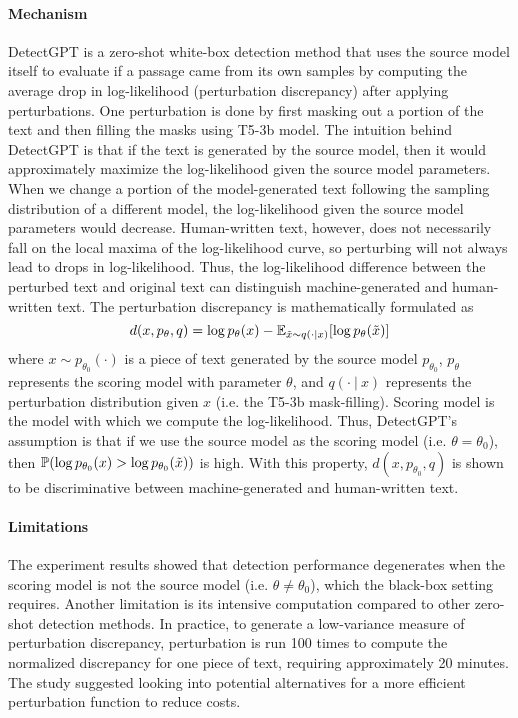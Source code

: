 \documentclass[11pt]{article}
\begin{document}
\paragraph{Mechanism} DetectGPT is a zero-shot white-box detection method that uses the source model itself to evaluate if a passage came from its own samples by computing the average drop in log-likelihood (perturbation discrepancy) after applying perturbations. One perturbation is done by first masking out a portion of the text and then filling the masks using T5-3b model. The intuition behind DetectGPT is that if the text is generated by the source model, then it would approximately maximize the log-likelihood given the source model parameters. When we change a portion of the model-generated text following the sampling distribution of a different model, the log-likelihood given the source model parameters would decrease. Human-written text, however, does not necessarily fall on the local maxima of the log-likelihood curve, so perturbing will not always lead to drops in log-likelihood. Thus, the log-likelihood difference between the perturbed text and original text can distinguish machine-generated and human-written text. The perturbation discrepancy is mathematically formulated as
\begin{equation}
    d(x, p_\theta, q) = \log p_\theta(x) - \mathbb{E}_{\Tilde{x}\sim q(\cdot|x)}[\log p_\theta(\Tilde{x})]
\end{equation}
where $x\sim p_{\theta_0}(\cdot)$ is a piece of text generated by the source model $p_{\theta_0}$, $p_\theta$ represents the scoring model with parameter $\theta$, and $q(\cdot~|~x)$ represents the perturbation distribution given $x$ (i.e. the T5-3b mask-filling). Scoring model is the model with which we compute the log-likelihood. Thus, DetectGPT's assumption is that if we use the source model as the scoring model (i.e. $\theta = \theta_0$), then $\mathbb{P}(\log p_{\theta_0}(x) > \log p_{\theta_0}(\Tilde{x}))$ is high. With this property, $d(x, p_{\theta_0}, q)$ is shown to be discriminative between machine-generated and human-written text.

\paragraph{Limitations} The experiment results showed that detection performance degenerates when the scoring model is not the source model (i.e. $\theta \neq \theta_0$), which the black-box setting requires. Another limitation is its intensive computation compared to other zero-shot detection methods. In practice, to generate a low-variance measure of perturbation discrepancy, perturbation is run 100 times to compute the normalized discrepancy for one piece of text, requiring approximately 20 minutes. The study suggested looking into potential alternatives for a more efficient perturbation function to reduce costs. 
\end{document}
